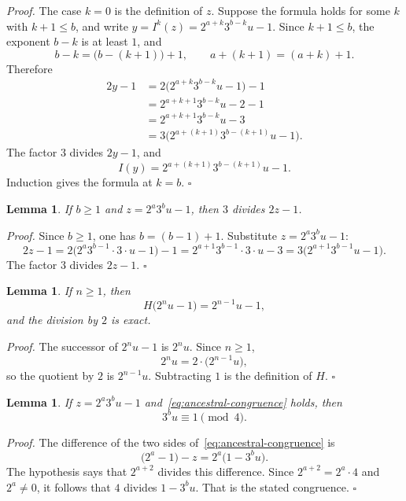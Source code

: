 \documentclass[11pt,letterpaper]{article}
\newtheorem{lemma}[theorem]{Lemma}
\newenvironment{proof}{\noindent\textit{Proof.}}{\hfill\(\square\)}
\begin{document}
\begin{proof}
The case \(k=0\) is the definition of \(z\). Suppose the formula holds for some
\(k\) with \(k+1\le b\), and write \(y=I^{k}(z)=2^{a+k}3^{b-k}u-1\).
Since \(k+1\le b\), the exponent \(b-k\) is at least \(1\), and
\[
b-k=\bigl(b-(k+1)\bigr)+1,
\qquad
a+(k+1)=(a+k)+1.
\]
Therefore
\begin{align*}
2y-1
&=2\bigl(2^{a+k}3^{b-k}u-1\bigr)-1 \\
&=2^{a+k+1}3^{b-k}u-2-1 \\
&=2^{a+k+1}3^{b-k}u-3 \\
&=3\bigl(2^{a+(k+1)}3^{b-(k+1)}u-1\bigr).
\end{align*}
The factor \(3\) divides \(2y-1\), and
\[
I(y)=2^{a+(k+1)}3^{b-(k+1)}u-1.
\]
Induction gives the formula at \(k=b\).
\end{proof}

\begin{lemma}
\label{lem:ancestral-first}
If \(b\ge 1\) and \(z=2^{a}3^{b}u-1\), then \(3\) divides \(2z-1\).
\end{lemma}

\begin{proof}
Since \(b\ge 1\), one has \(b=(b-1)+1\). Substitute
\(z=2^{a}3^{b}u-1\):
\[
2z-1=2\bigl(2^{a}3^{b-1}\cdot 3\cdot u-1\bigr)-1
=2^{a+1}3^{b-1}\cdot 3\cdot u-3
=3\bigl(2^{a+1}3^{b-1}u-1\bigr).
\]
The factor \(3\) divides \(2z-1\).
\end{proof}

\begin{lemma}
\label{lem:ancestral-half}
If \(n\ge 1\), then
\[
H\bigl(2^{n}u-1\bigr)=2^{n-1}u-1,
\]
and the division by \(2\) is exact.
\end{lemma}

\begin{proof}
The successor of \(2^{n}u-1\) is \(2^{n}u\). Since \(n\ge 1\),
\[
2^{n}u=2\cdot\bigl(2^{n-1}u\bigr),
\]
so the quotient by \(2\) is \(2^{n-1}u\). Subtracting \(1\) is the definition
of \(H\).
\end{proof}

\begin{lemma}
\label{lem:ancestral-odd-part}
If \(z=2^{a}3^{b}u-1\) and~\eqref{eq:ancestral-congruence} holds, then
\[
3^{b}u\equiv 1\pmod{4}.
\]
\end{lemma}

\begin{proof}
The difference of the two sides of~\eqref{eq:ancestral-congruence} is
\[
\bigl(2^{a}-1\bigr)-z=2^{a}\bigl(1-3^{b}u\bigr).
\]
The hypothesis says that \(2^{a+2}\) divides this difference. Since
\(2^{a+2}=2^{a}\cdot 4\) and \(2^{a}\neq 0\), it follows that \(4\) divides
\(1-3^{b}u\). That is the stated congruence.
\end{proof}
\end{document}
